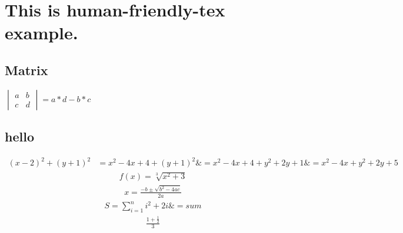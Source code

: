 \documentclass{article}
\begin{document}
        \section{This is human-friendly-tex example.}\subsection{Matrix}$\begin{vmatrix}a&b\\c&d\end{vmatrix}= a*d - b*c$\subsection{hello}\begin{align*}(x-2)^2+(y+1)^2&= x^2-4x+4+(y+1)^2 \&= x^2-4x+4+y^2+2y+1 \&= x^2-4x+y^2+2y+5\end{align*}\begin{align*}f(x)=\sqrt[3]{x^2+3}\end{align*}\begin{align*}x=\frac{-b \pm \sqrt{b^2-4ac}}{2a}\end{align*}\begin{align*}S=\sum_{i=1}^{n} i^2+2i \&=sum\end{align*}\begin{align*}\frac{1+\frac{1}{2}}{3}\end{align*}
        
\end{document}
